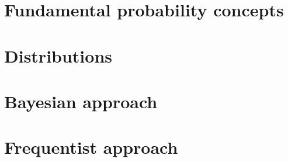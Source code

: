 \section{Fundamental probability concepts}


\section{Distributions}


% 

\section{Bayesian approach}


\section{Frequentist approach}
% 
